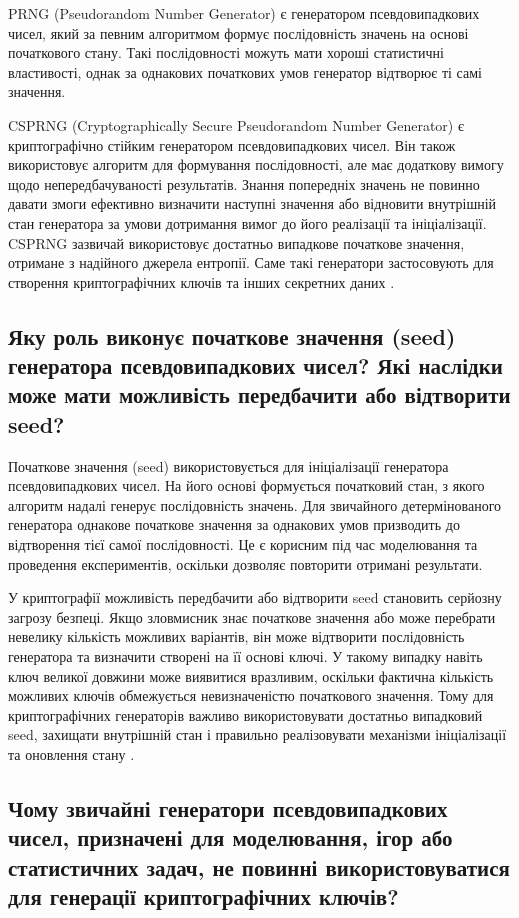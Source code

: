 PRNG (Pseudorandom Number Generator) є генератором псевдовипадкових чисел, який за певним алгоритмом формує послідовність значень на основі початкового стану. 
Такі послідовності можуть мати хороші статистичні властивості, однак за однакових початкових умов генератор відтворює ті самі значення.

CSPRNG (Cryptographically Secure Pseudorandom Number Generator) є криптографічно стійким генератором псевдовипадкових чисел. Він також використовує алгоритм 
для формування послідовності, але має додаткову вимогу щодо непередбачуваності результатів. Знання попередніх значень не повинно давати змоги ефективно визначити 
наступні значення або відновити внутрішній стан генератора за умови дотримання вимог до його реалізації та ініціалізації. 
CSPRNG зазвичай використовує достатньо випадкове початкове значення, отримане з надійного джерела ентропії. Саме такі генератори застосовують для створення криптографічних 
ключів та інших секретних даних \cite{RFC4086,NIST80090A}.

\subsection{Яку роль виконує початкове значення (seed) генератора псевдовипадкових чисел? Які наслідки може мати можливість передбачити або відтворити seed?}

Початкове значення (seed) використовується для ініціалізації генератора псевдовипадкових чисел. На його основі формується початковий стан, 
з якого алгоритм надалі генерує послідовність значень. Для звичайного детермінованого генератора однакове початкове значення за однакових умов призводить 
до відтворення тієї самої послідовності. Це є корисним під час моделювання та проведення експериментів, оскільки дозволяє повторити отримані результати.

У криптографії можливість передбачити або відтворити seed становить серйозну загрозу безпеці. Якщо зловмисник знає початкове значення або може перебрати невелику 
кількість можливих варіантів, він може відтворити послідовність генератора та визначити створені на її основі ключі. У такому випадку навіть ключ великої довжини може виявитися вразливим, 
оскільки фактична кількість можливих ключів обмежується невизначеністю початкового значення. Тому для криптографічних генераторів важливо використовувати достатньо випадковий seed, 
захищати внутрішній стан і правильно реалізовувати механізми ініціалізації та оновлення стану \cite{RFC4086,NIST80090A}.

\subsection{Чому звичайні генератори псевдовипадкових чисел, призначені для моделювання, ігор або статистичних задач, не повинні використовуватися для генерації криптографічних ключів?}

